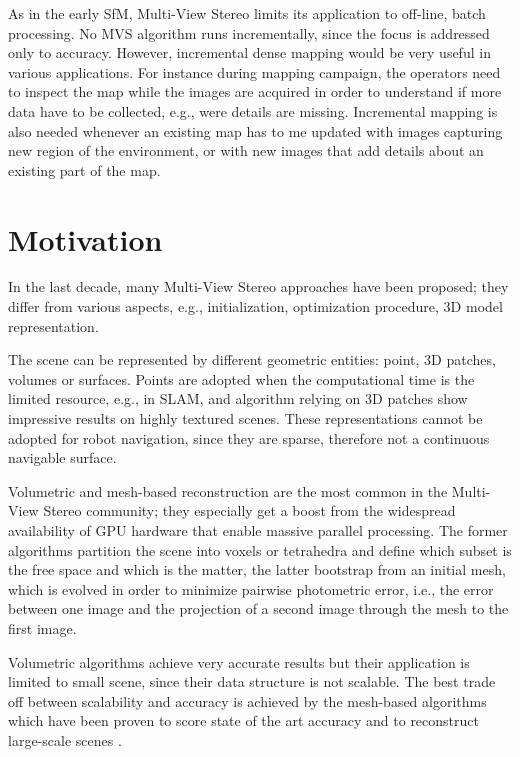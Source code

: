 As in the early SfM,  Multi-View Stereo limits its application to off-line, batch processing. No MVS algorithm runs incrementally, since the focus is addressed only to accuracy.
However, incremental dense mapping would be very useful in various applications. 
For instance during mapping campaign, the operators need to inspect the map while the images are  acquired in order to understand if more data have to be collected, e.g., were details are missing. 
Incremental mapping is also needed whenever an existing map has to me updated with images capturing new region of the environment, or with new images that add details about an existing part of the map.

\section{Motivation}
In the last decade, many Multi-View Stereo approaches have been proposed; they differ from various aspects, e.g., initialization, optimization procedure, 3D model representation.

The scene can be represented by different geometric entities: point, 3D patches, volumes or surfaces.
Points are adopted when the computational time is the limited resource, e.g., in SLAM, and algorithm relying on 3D patches show impressive results on highly textured scenes. 
These representations cannot be adopted for robot navigation, since they are sparse, therefore not a continuous navigable surface.

Volumetric and mesh-based reconstruction are the most common in the Multi-View Stereo community; they especially get a boost from the widespread availability of GPU hardware that enable massive parallel processing.
The former algorithms partition the scene into voxels or tetrahedra and define which subset is the free space and which is the matter, the latter bootstrap from an initial mesh, which is evolved in order to minimize pairwise photometric error, i.e., the error between one image and the projection of a second image through the mesh to the first image.

Volumetric algorithms achieve very accurate results but their application is limited to small scene, since their data structure is not scalable. 
The best trade off between scalability and accuracy is achieved by the mesh-based algorithms which have been proven to score state of the art accuracy \cite{li2015detail} and to reconstruct large-scale scenes \cite{vu_et_al_2012}.


